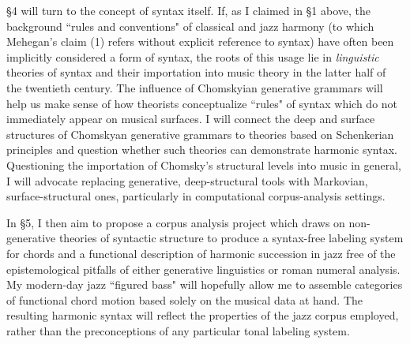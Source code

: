 \S 4 will turn to the concept of syntax itself.  If, as I claimed in \S 1 above, the background ``rules and conventions" of classical and jazz harmony (to which Mehegan's claim (1) refers without explicit reference to syntax) have often been implicitly considered a form of syntax, the roots of this usage lie in \emph{linguistic} theories of syntax and their importation into music theory in the latter half of the twentieth century. The influence of Chomskyian generative grammars will help us make sense of how theorists conceptualize ``rules" of syntax which do not immediately appear on musical surfaces.  I will connect the deep and surface structures of Chomskyan generative grammars to theories based on Schenkerian principles and question whether such theories can demonstrate harmonic syntax.  Questioning the importation of Chomsky's structural levels into music in general, I will advocate replacing generative, deep-structural tools with Markovian, surface-structural ones, particularly in computational corpus-analysis settings.

In \S 5, I then aim to propose a corpus analysis project which draws on non-generative theories of syntactic structure to produce a syntax-free labeling system for chords and a functional description of harmonic succession in jazz free of the epistemological pitfalls of either generative linguistics or roman numeral analysis.  My modern-day jazz ``figured bass" will hopefully allow me to assemble categories of functional chord motion based solely on the musical data at hand.  The resulting harmonic syntax will reflect the properties of the jazz corpus employed, rather than the preconceptions of any particular tonal labeling system.

